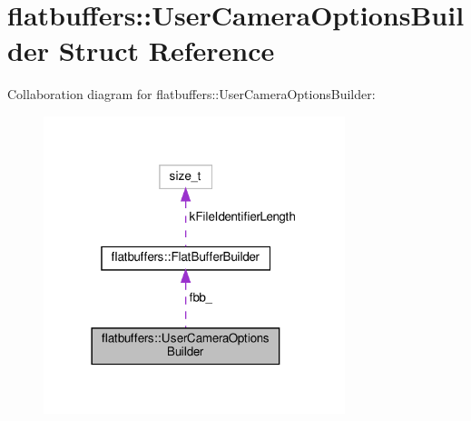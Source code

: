 \hypertarget{structflatbuffers_1_1UserCameraOptionsBuilder}{}\section{flatbuffers\+:\+:User\+Camera\+Options\+Builder Struct Reference}
\label{structflatbuffers_1_1UserCameraOptionsBuilder}


Collaboration diagram for flatbuffers\+:\+:User\+Camera\+Options\+Builder\+:
\nopagebreak
\begin{figure}[H]
\begin{center}
\leavevmode
\includegraphics[width=249pt]{structflatbuffers_1_1UserCameraOptionsBuilder__coll__graph}
\end{center}
\end{figure}
